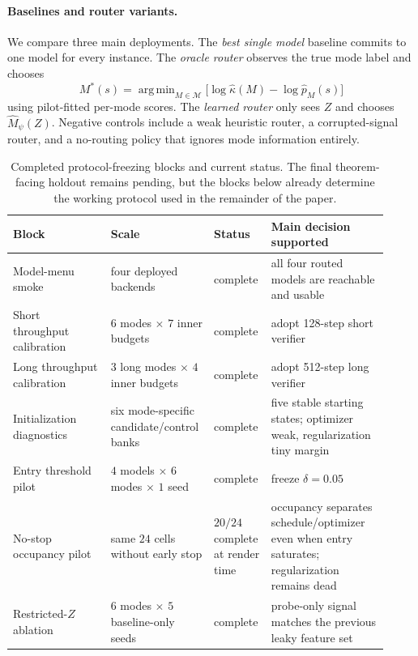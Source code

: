 \documentclass{article}
\DeclareMathOperator*{\argmin}{arg\,min}
\begin{document}
\paragraph{Baselines and router variants.}
We compare three main deployments.
The \emph{best single model} baseline commits to one model for every instance.
The \emph{oracle router} observes the true mode label and chooses
\[
  M^*(s)=\argmin_{M\in\mathcal M}\bigl[\log \hat\kappa(M)-\log \hat p_M(s)\bigr]
\]
using pilot-fitted per-mode scores.
The \emph{learned router} only sees $Z$ and chooses $\hat M_\psi(Z)$.
Negative controls include a weak heuristic router, a corrupted-signal router, and a no-routing policy that ignores mode information entirely.

\begin{table}[t]
\centering
\small
\setlength{\tabcolsep}{3pt}
\caption{Completed protocol-freezing blocks and current status.
The final theorem-facing holdout remains pending, but the blocks below already determine the working protocol used in the remainder of the paper.}
\label{tab:campaign}
\begin{tabular}{@{}p{0.25\linewidth}p{0.25\linewidth}p{0.12\linewidth}p{0.30\linewidth}@{}}
\toprule
Block & Scale & Status & Main decision supported \\
\midrule
Model-menu smoke & four deployed backends & complete & all four routed models are reachable and usable \\
Short throughput calibration & $6$ modes $\times$ $7$ inner budgets & complete & adopt 128-step short verifier \\
Long throughput calibration & $3$ long modes $\times$ $4$ inner budgets & complete & adopt 512-step long verifier \\
Initialization diagnostics & six mode-specific candidate/control banks & complete & five stable starting states; optimizer weak, regularization tiny margin \\
Entry threshold pilot & $4$ models $\times$ $6$ modes $\times$ $1$ seed & complete & freeze $\delta=0.05$ \\
No-stop occupancy pilot & same $24$ cells without early stop & $20/24$ complete at render time & occupancy separates schedule/optimizer even when entry saturates; regularization remains dead \\
Restricted-$Z$ ablation & $6$ modes $\times$ $5$ baseline-only seeds & complete & probe-only signal matches the previous leaky feature set \\
\bottomrule
\end{tabular}
\end{table}
\end{document}
